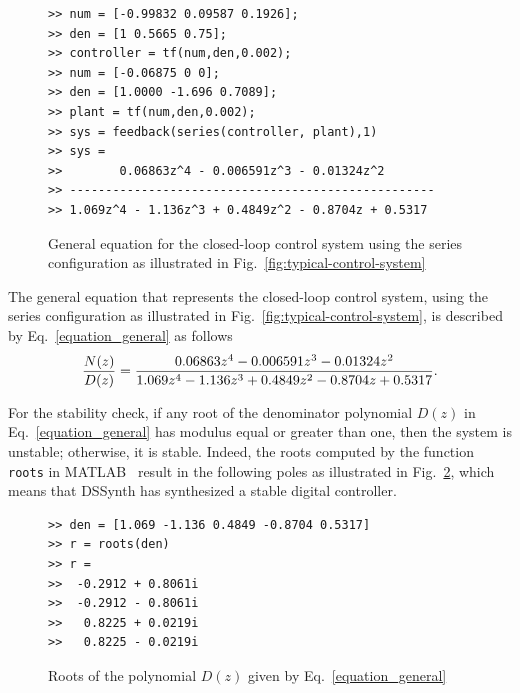 \documentclass[10pt,conference]{IEEEtran}
\begin{document}
\begin{figure}[ht]
\scriptsize
\begin{lstlisting}[xleftmargin=.025\textwidth,xrightmargin=.025\textwidth, frame=single,basicstyle=\tt]
>> num = [-0.99832 0.09587 0.1926];
>> den = [1 0.5665 0.75];
>> controller = tf(num,den,0.002);
>> num = [-0.06875 0 0];
>> den = [1.0000 -1.696 0.7089];
>> plant = tf(num,den,0.002);
>> sys = feedback(series(controller, plant),1)
>> sys =
>>        0.06863z^4 - 0.006591z^3 - 0.01324z^2
>> ---------------------------------------------------
>> 1.069z^4 - 1.136z^3 + 0.4849z^2 - 0.8704z + 0.5317
\end{lstlisting}
\vspace{-0.2cm}
\caption{General equation for the closed-loop control system using the series configuration as
illustrated in Fig.~\ref{fig:typical-control-system}}
\label{combine-controller-plant}
\end{figure}

The general equation that represents the closed-loop control system, using
the series configuration as illustrated in
Fig.~\ref{fig:typical-control-system}, is described by
Eq.~\ref{equation_general} as follows
%
\begin{equation}
\small
\label{equation_general}
\frac{N(z)}{D(z)}=\frac{0.06863z^{4} - 0.006591z^{3} - 0.01324z^{2}}{1.069z^{4} - 1.136z^{3} + 0.4849z^{2} -0.8704z + 0.5317}.
\end{equation}
 
For the stability check, if any root of the denominator polynomial $D(z)$ in
Eq.~\ref{equation_general} has modulus equal or greater than one, then the
system is unstable; otherwise, it is stable.  Indeed, the roots computed by
the function \texttt{roots} in MATLAB~\cite{matlab-toolbox} result in the
following poles as illustrated in Fig.~\ref{roots-of-dz}, which means that
DSSynth has synthesized a stable digital controller.

\begin{figure}[ht]
\scriptsize
\begin{lstlisting}[xleftmargin=.025\textwidth,xrightmargin=.025\textwidth, frame=single, basicstyle=\tt]
>> den = [1.069 -1.136 0.4849 -0.8704 0.5317]
>> r = roots(den)
>> r =
>>  -0.2912 + 0.8061i
>>  -0.2912 - 0.8061i
>>   0.8225 + 0.0219i
>>   0.8225 - 0.0219i
\end{lstlisting}
\vspace{-0.2cm}
\caption{Roots of the polynomial $D(z)$ given by Eq.~\ref{equation_general}}
\label{roots-of-dz}
\end{figure}
\end{document}
